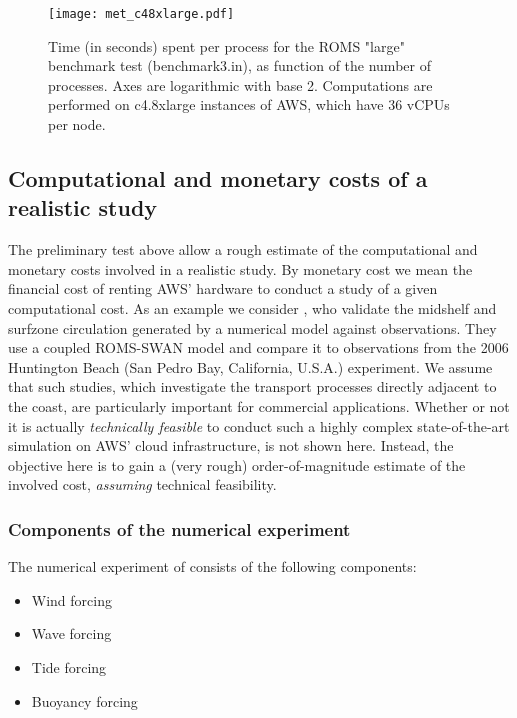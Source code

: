 \documentclass[12pt,a4paper]{article}
\begin{document}
\begin{figure}[H]
	\centering
	\texttt{[image: met\_c48xlarge.pdf]}
	\caption{Time (in seconds) spent per process for the ROMS "large" benchmark test (benchmark3.in), as function of the number of processes.  Axes are logarithmic with base 2. Computations are performed on c4.8xlarge instances of AWS, which have 36 vCPUs per node.}
	\label{fig:met_c48xlarge}
\end{figure}

\subsection{Computational and monetary costs of a realistic study}

The preliminary test above allow a rough estimate of the computational and monetary costs involved in a realistic study. By monetary cost we mean the financial cost of renting AWS' hardware to conduct a study of a given computational cost. As an example we consider \cite{kumar2015midshelf}, who validate the midshelf and surfzone circulation generated by a numerical model against observations.  They use a coupled ROMS-SWAN model and compare it to observations from the 2006 Huntington Beach (San Pedro Bay, California, U.S.A.) experiment. We assume that such studies, which investigate the transport processes directly adjacent to the coast, are particularly important for commercial applications. Whether or not it is actually \emph{technically feasible} to conduct such a highly complex state-of-the-art simulation on AWS' cloud infrastructure, is not shown here. Instead, the objective here is to gain a (very rough) order-of-magnitude estimate of the involved cost, \emph{assuming} technical feasibility. 

\subsubsection{Components of the numerical experiment}

The numerical experiment of \cite{kumar2015midshelf} consists of the following components:

\begin{itemize}
	\item Wind forcing
	\item Wave forcing
	\item Tide forcing
	\item Buoyancy forcing
\end{itemize}
\end{document}
